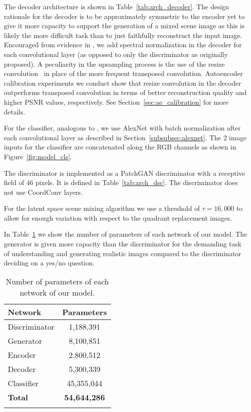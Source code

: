 \documentclass[12pt,a4paper]{article}
\begin{document}
The decoder architecture is shown in Table~\ref{tab:arch_decoder}. The design rationale for the decoder is to be approximately symmetric to the encoder yet to give it more capacity to support the generation of a mixed scene image as this is likely the more difficult task than to just faithfully reconstruct the input image. Encouraged from evidence in \cite{SAGAN}, we add spectral normalization in the decoder for each convolutional layer (as opposed to only the discriminator as originally proposed). A peculiarity in the upsampling process is the use of the resize convolution~\cite{ResizeConv} in place of the more frequent transposed convolution. Autoencoder calibration experiments we conduct show that resize convolution in the decoder outperforms transposed convolution in terms of better reconstruction quality and higher PSNR values, respectively. See Section~\ref{sec:ae_calibration} for more details.




For the classifier, analogous to \cite{DisentFacOfVarByMixTh}, we use AlexNet with batch normalization after each convolutional layer as described in Section~\ref{subsubsec:alexnet}. The 2 image inputs for the classifier are concatenated along the RGB channels as shown in  Figure~\ref{fig:model_cls}.

The discriminator is implemented as a PatchGAN discriminator with a receptive field of 46 pixels. It is defined in Table~\ref{tab:arch_dsc}. The discriminator does not use CoordConv layers.



For the latent space scene mixing algorithm we use a threshold of $\tau = 16,000$ to allow for enough variation with respect to the quadrant replacement images.

In Table~\ref{tab:params} we show the number of parameters of each network of our model. The generator is given more capacity than the discriminator for the demanding task of understanding and generating realistic images compared to the discriminator deciding on a yes/no question.
\begin{table} [ht!]
\centering
\begin{tabular}{l|c}
\Xhline{0.8pt}
\textbf{Network} & \textbf{Parameters}\\
\hline
Discriminator & 1,188,391 \\
\hline
Generator & 8,100,851 \\
\quad Encoder & 2,800,512 \\
\quad Decoder & 5,300,339 \\
\hline
Classifier & 45,355,044 \\
\hline
\textbf{Total} & \textbf{54,644,286} \\
\Xhline{0.8pt}
\end{tabular}
\caption{Number of parameters of each network of our model.} \label{tab:params}
\end{table}
\end{document}
